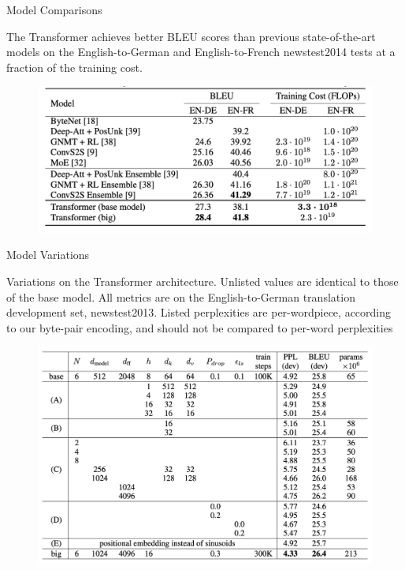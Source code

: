 \documentclass{beamer}
\begin{document}
\begin{frame}{Model Comparisons}

The Transformer achieves better BLEU scores than previous state-of-the-art models on the
English-to-German and English-to-French newstest2014 tests at a fraction of the training cost. 

\begin{figure}[htbp]
    \centering
    \includegraphics[width=1\linewidth]{f21.png}
    \label{fig:enter-label}
\end{figure}
    
\end{frame}

\begin{frame}{Model Variations}

Variations on the Transformer architecture. Unlisted values are identical to those of the base model. All metrics are on the English-to-German translation development set, newstest2013. Listed perplexities are per-wordpiece, according to our byte-pair encoding, and should not be compared to per-word perplexities
\begin{figure}
    \centering
    \includegraphics[width=0.75\linewidth]{f22.png}
    \label{fig:enter-label}
\end{figure}
\end{frame}
\end{document}
